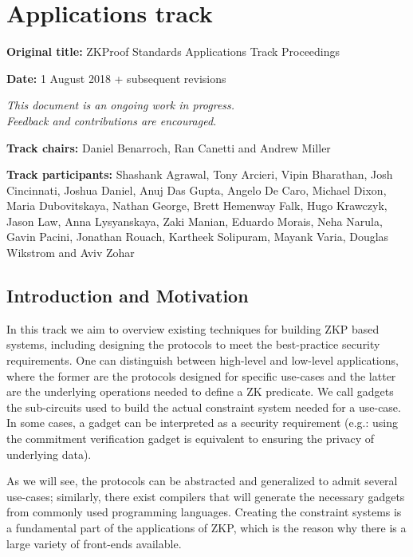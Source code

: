 \chapter{Applications track}
\label{chap:track-apps}

\vspace{2em}
\textbf{Original title:} ZKProof Standards Applications Track Proceedings

\textbf{Date:} 1 August 2018 + subsequent revisions

{\itshape\centering
{\color{ongoingred} This document is an ongoing work in progress.}\\
{\color{ongoingred} Feedback and contributions are encouraged.}\\
}

\vspace{1em}
\textbf{Track chairs:} 
Daniel Benarroch, Ran Canetti and Andrew Miller

\textbf{Track participants:} 
Shashank Agrawal, Tony Arcieri, Vipin Bharathan, Josh Cincinnati, Joshua Daniel,  Anuj Das Gupta, Angelo De Caro, Michael Dixon, Maria Dubovitskaya, Nathan George, Brett Hemenway Falk, Hugo Krawczyk, Jason Law, Anna Lysyanskaya, Zaki Manian, Eduardo Morais, Neha Narula, Gavin Pacini, Jonathan Rouach, Kartheek Solipuram, Mayank Varia, Douglas Wikstrom and Aviv Zohar 


\section{Introduction and Motivation}
\label{apps:intro}
 
In this track we aim to overview existing techniques for building ZKP based systems, including designing the protocols to meet the best-practice security requirements. One can distinguish between high-level and low-level applications, where the former are the protocols designed for specific use-cases and the latter are the underlying operations needed to define a ZK predicate. We call gadgets the sub-circuits used to build the actual constraint system needed for a use-case. In some cases, a gadget can be interpreted as a security requirement (e.g.: using the commitment verification gadget is equivalent to ensuring the privacy of underlying data). 

As we will see, the protocols can be abstracted and generalized to admit several use-cases; similarly, there exist compilers that will generate the necessary gadgets from commonly used programming languages. Creating the constraint systems is a fundamental part of the applications of ZKP, which is the reason why there is a large variety of front-ends available.

